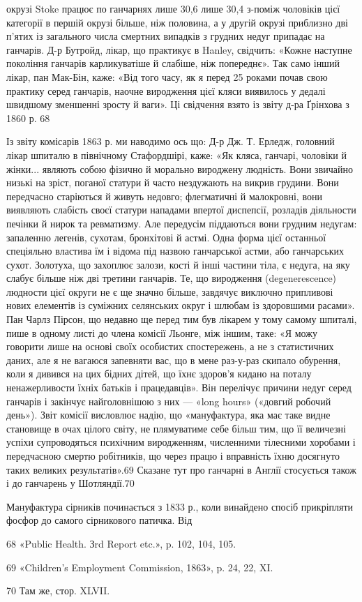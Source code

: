окрузі Stoke працює по ганчарнях лише 30,6%
лише 30,4%
з-поміж чоловіків цієї категорії в першій окрузі більше, ніж
половина, а у другій окрузі приблизно дві п’ятих із загального
числа смертних випадків з грудних недуг припадає на ганчарів.
Д-р Бутройд, лікар, що практикує в Hanley, свідчить: «Кожне
наступне покоління ганчарів карликуватіше й слабіше, ніж попереднє».
Так само інший лікар, пан Мак-Бін, каже: «Від того
часу, як я перед 25 роками почав свою практику серед ганчарів,
наочне виродження цієї кляси виявилось у дедалі швидшому
зменшенні зросту й ваги». Ці свідчення взято із звіту д-ра
Ґрінхова з 1860 р. 68

Із звіту комісарів 1863 р. ми наводимо ось що: Д-р Дж.
Т. Ерледж, головний лікар шпиталю в північному Стафордшірі,
каже: «Як кляса, ганчарі, чоловіки й жінки... являють собою
фізично й морально вироджену людність. Вони звичайно низькі
на зріст, поганої статури й часто нездужають на викрив грудини.
Вони передчасно старіються й живуть недовго; флегматичні й
малокровні, вони виявляють слабість своєї статури нападами
впертої диспепсії, розладів діяльности печінки й нирок та ревматизму.
Але передусім піддаються вони грудним недугам: запаленню
легенів, сухотам, бронхітові й астмі. Одна форма цієї
останньої спеціяльно властива їм і відома під назвою ганчарської
астми, або ганчарських сухот. Золотуха, що захоплює залози,
кості й інші частини тіла, є недуга, на яку слабує більше ніж
дві третини ганчарів. Те, що виродження (degenerescence) людности
цієї округи не є ще значно більше, завдячує виключно
припливові нових елементів із суміжних селянських округ і
шлюбам із здоровшими расами». Пан Чарлз Пірсон, що недавно
ще перед тим був лікарем у тому самому шпиталі, пише
в одному листі до члена комісії Льонге, між іншим, таке: «Я можу
говорити лише на основі своїх особистих спостережень, а не з
статистичних даних, але я не вагаюся запевняти вас, що в мене
раз-у-раз скипало обурення, коли я дивився на цих бідних
дітей, що їхнє здоров’я кидано на поталу ненажерливости їхніх
батьків і працедавців». Він перелічує причини недуг серед ганчарів
і закінчує найголовнішою з них — «long hours» («довгий
робочий день»). Звіт комісії висловлює надію, що «мануфактура,
яка має таке видне становище в очах цілого світу, не плямуватиме
себе більш тим, що її величезні успіхи супроводяться психічним
виродженням, численними тілесними хоробами і передчасною
смертю робітників, що через працю і вправність їхню
досягнуто таких великих результатів».69 Сказане тут про ганчарні
в Англії стосується також і до ганчарень у Шотляндії.70

Мануфактура сірників починається з 1833 р., коли винайдено
спосіб прикріпляти фосфор до самого сірникового патичка. Від

68 «Public Health. Зrd Report etc.», p. 102, 104, 105.

69 «Children’s Employment Commission, 1863», p. 24, 22, XI.

70    Там же, стор. XLVII.
